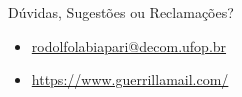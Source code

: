\documentclass[aspectratio=169, xcolor=dvipsnames]{beamer}
\let\olditem=\item%
\renewcommand{\item}{\olditem \justifying}
\begin{document}

\begin{frame}{Dúvidas, Sugestões ou Reclamações?}
	\begin{itemize}
		\item \url{rodolfolabiapari@decom.ufop.br} \\[1cm]
		\item \url{https://www.guerrillamail.com/}
	\end{itemize}
\end{frame}

\frame{\titlepage}
\end{document}
